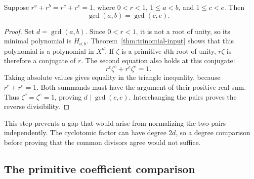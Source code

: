 \begin{lemma}
\label{lem:intrinsic-gcd}
Suppose $r^a+r^b=r^c+r^e=1$, where $0<r<1$,
$1\le a<b$, and $1\le c<e$.  Then
\[
\gcd(a,b)=\gcd(c,e).
\]
\end{lemma}

\begin{proof}
Set $d=\gcd(a,b)$.  Since $0<r<1$, it is not a root of unity, so
its minimal polynomial is $H_{a,b}$.  Theorem~\ref{thm:trinomial-input}
shows that this polynomial is a polynomial in $X^d$.  If $\zeta$ is a
primitive $d$th root of unity, $r\zeta$ is therefore a conjugate of $r$.
The second equation also holds at this conjugate:
\[
r^c\zeta^c+r^e\zeta^e=1.
\]
Taking absolute values gives equality in the triangle inequality,
because $r^c+r^e=1$.  Both summands must have the argument of their
positive real sum.  Thus $\zeta^c=\zeta^e=1$, proving
$d\mid\gcd(c,e)$.  Interchanging the pairs proves the reverse
divisibility.
\end{proof}

This step prevents a gap that would arise from normalizing the two
pairs independently.  The cyclotomic factor can have degree $2d$,
so a degree comparison before proving that the common divisors agree
would not suffice.

\subsection{The primitive coefficient comparison}

